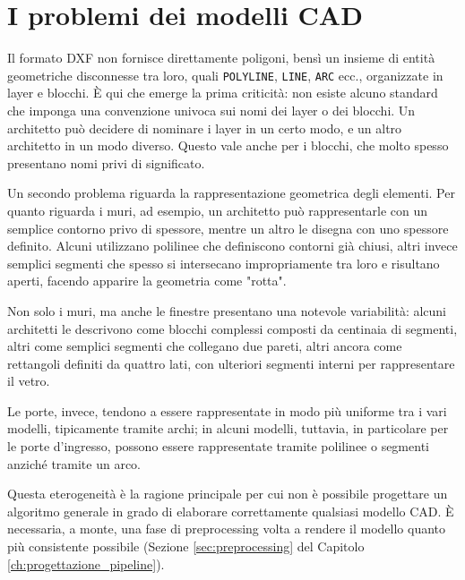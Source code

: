 \section{I problemi dei modelli CAD}
\label{sec:problemi_modelli_CAD}


Il formato DXF non fornisce direttamente poligoni, bensì un insieme di entità geometriche disconnesse tra loro, quali \texttt{POLYLINE}, \texttt{LINE}, \texttt{ARC} ecc., organizzate in layer e blocchi. È qui che emerge la prima criticità: non esiste alcuno standard che imponga una convenzione univoca sui nomi dei layer o dei blocchi. Un architetto può decidere di nominare i layer in un certo modo, e un altro architetto in un modo diverso. Questo vale anche per i blocchi, che molto spesso presentano nomi privi di significato.

Un secondo problema riguarda la rappresentazione geometrica degli elementi. Per quanto riguarda i muri, ad esempio, un architetto può rappresentarle con un semplice contorno privo di spessore, mentre un altro le disegna con uno spessore definito. Alcuni utilizzano polilinee che definiscono contorni già chiusi, altri invece semplici segmenti che spesso si intersecano impropriamente tra loro e risultano aperti, facendo apparire la geometria come "rotta".

Non solo i muri, ma anche le finestre presentano una notevole variabilità: alcuni architetti le descrivono come blocchi complessi composti da centinaia di segmenti, altri come semplici segmenti che collegano due pareti, altri ancora come rettangoli definiti da quattro lati, con ulteriori segmenti interni per rappresentare il vetro.

Le porte, invece, tendono a essere rappresentate in modo più uniforme tra i vari modelli, tipicamente tramite archi; in alcuni modelli, tuttavia, in particolare per le porte d'ingresso, possono essere rappresentate tramite polilinee o segmenti anziché tramite un arco.

Questa eterogeneità è la ragione principale per cui non è possibile progettare un algoritmo generale in grado di elaborare correttamente qualsiasi modello CAD. È necessaria, a monte, una fase di preprocessing volta a rendere il modello quanto più consistente possibile (Sezione \ref{sec:preprocessing} del Capitolo \ref{ch:progettazione_pipeline}).



